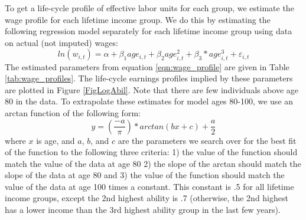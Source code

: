   To get a life-cycle profile of effective labor units for each group, we estimate the wage profile for each lifetime income group.  We do this by estimating the following regression model separately for each lifetime income group using data on actual (not imputed) wages:
  \begin{equation}\label{eqn:wage_profile}
    ln(w_{i,t})=\alpha +  \beta_{1}age_{i,t} + \beta_{2}age_{i,t}^{2} + \beta_{3}*age_{i,t}^{3}+ \varepsilon_{i,t}
  \end{equation}
  The estimated parameters from equation \eqref{eqn:wage_profile} are given in Table \ref{tab:wage_profiles}. The life-cycle earnings profiles implied by these parameters are plotted in Figure \ref{FigLogAbil}. Note that there are few individuals above age 80 in the data. To extrapolate these estimates for model ages 80-100, we use an arctan function of the following form:
  \begin{equation}\label{EqLfEarnArctan}
    y = \left(\frac{-a}{\pi}\right)*arctan(bx+c)+\frac{a}{2}
  \end{equation}
  where $x$ is age, and $a$, $b$, and $c$ are the parameters we search over for the best fit of the function to the following three criteria: 1) the value of the function should match the value of the data at age 80 2) the slope of the arctan should match the slope of the data at age 80 and 3) the value of the function should match the value of the data at age 100 times a constant.  This constant is .5 for all lifetime income groups, except the 2nd highest ability is .7 (otherwise, the 2nd highest has a lower income than the 3rd highest ability group in the last few years).

